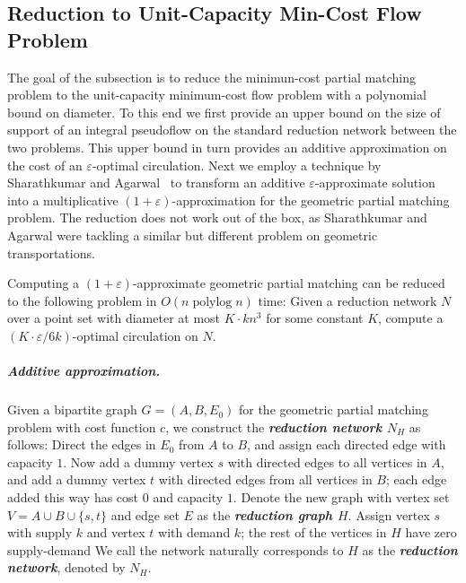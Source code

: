 \documentclass[a4paper,UKenglish]{socg-lipics-v2018}
\def\polylog{\mathop{\mathrm{polylog}}}
\def\eps{\varepsilon}
\def\set#1{\{ #1 \}}
\theoremstyle{plain}
\numberwithin{figure}{section}
\renewcommand{\paragraph}{\subparagraph}
\def\EMPH#1{\textbf{\emph{\boldmath #1}}}
\begin{document}


\subsection{Reduction to Unit-Capacity Min-Cost Flow Problem}
\label{SS:reduction}

The goal of the subsection is to reduce the minimun-cost partial matching problem to the unit-capacity minimum-cost flow problem with a polynomial bound on diameter.
To this end we first provide an upper bound on the size of support of an integral pseudoflow on the standard reduction network between the two problems.
This upper bound in turn provides an additive approximation on the cost of an $\eps$-optimal circulation.
Next we employ a technique by Sharathkumar and Agarwal~\cite{SA12} to transform an additive $\eps$-approximate solution into a multiplicative $(1+\eps)$-approximation for the geometric partial matching problem.  The reduction does not work out of the box, as Sharathkumar and Agarwal were tackling a similar but different problem on geometric transportations.

\begin{lemma}
\label{lemma:cost_scale_approx}
Computing a $(1+\eps)$-approximate geometric partial matching can be reduced to the following problem in $O(n \polylog n)$ time:
Given a reduction network $N$ over a point set with diameter at most $K \cdot kn^3$ for some constant $K$, compute a $(K \cdot \eps/6k)$-optimal circulation on $N$.
\end{lemma}


\paragraph{Additive approximation.}
Given a bipartite graph $G = (A,B,E_0)$ for the geometric partial matching problem with cost function $c$, we construct the \EMPH{reduction network $N_H$} as follows:
Direct the edges in $E_0$ from $A$ to $B$, and assign each directed edge with capacity $1$.  Now add a dummy vertex $s$ with directed edges to all vertices in $A$, and add a dummy vertex $t$ with directed edges from all vertices in $B$; each edge added this way has cost $0$ and capacity $1$.
Denote the new graph with vertex set $V = A \cup B \cup \set{s,t}$ and edge set $E$ as the \EMPH{reduction graph $H$}.
Assign vertex $s$ with supply $k$ and vertex $t$ with demand $k$; the rest of the vertices in $H$ have zero supply-demand
We call the network naturally corresponds to $H$ as the \EMPH{reduction network}, denoted by \EMPH{$N_H$}.
\end{document}
